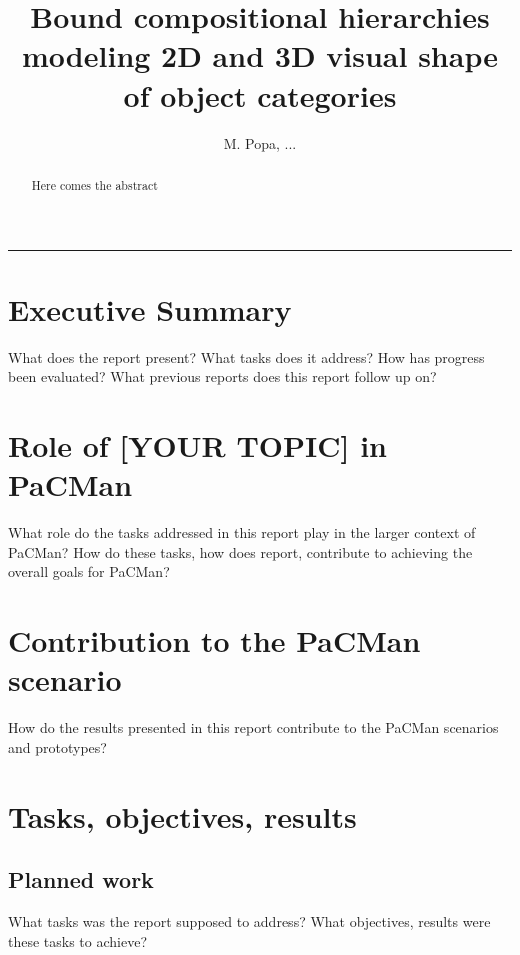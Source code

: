 \documentclass[a4paper,11pt,pdf]{pacmanreport}
\title{Bound compositional hierarchies modeling 2D and 3D visual shape of object categories}
\author{M. Popa, ...}
\begin{document}
\maketitle

\begin{abstract}
\noindent Here comes the abstract
\end{abstract}


\vspace{.2em}
\hrule

\footnotesize

\tableofcontents

\normalsize

\newpage

\section*{Executive Summary}

What does the report present? What tasks does it address? How has progress been evaluated? What previous reports does this report follow up on? 

\section*{Role of [YOUR TOPIC] in PaCMan}

What role do the tasks addressed in this report play in the larger context of PaCMan? How do these tasks, how does report, contribute to achieving the overall goals for PaCMan? 

\section*{Contribution to the PaCMan scenario}

How do the results presented in this report contribute to the PaCMan\cite{ProjectWebsite} scenarios and prototypes? 


\newpage

\section{Tasks, objectives, results}

\subsection{Planned work}

What tasks was the report supposed to address? What objectives, results were these tasks to achieve? 
\end{document}
